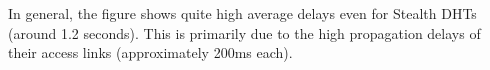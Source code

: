 \documentclass[times, 10pt,twocolumn]{article}
\begin{document}
In general, the figure shows quite  high average delays even for
Stealth DHTs (around 1.2 seconds). This is primarily due to the high
propagation delays of their access links (approximately 200ms each).

%
%
%
\end{document}
